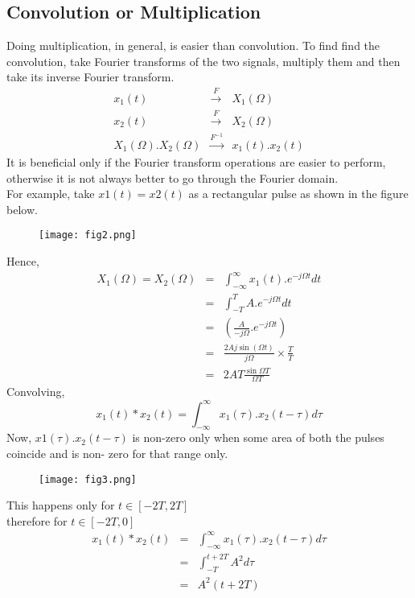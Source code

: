 \subsection{Convolution or Multiplication}
Doing multiplication, in general, is easier than convolution. To find find the convolution, take Fourier transforms of the two signals, multiply them and then take its inverse Fourier transform.
\begin{eqnarray}
x_1(t) &\xrightarrow{F}& X_1(\Omega)\\
x_2(t) &\xrightarrow{F}& X_2(\Omega)\\
X_1(\Omega).X_2(\Omega) &\xrightarrow{F^{-1}}& x_1(t).x_2(t)
\end{eqnarray}
It is beneficial only if the Fourier transform operations are easier to perform, otherwise it is not always better to go through the Fourier domain.\\
For example, take $x1(t)=x2(t)$ as a rectangular pulse as shown in the figure below.
\begin{figure}[h!]
\centering
\texttt{[image: fig2.png]}
\end{figure}
Hence,
\begin{eqnarray}
X_1(\Omega)=X_2(\Omega) &=& \int_{-\infty}^{\infty} x_1(t). e^{-j\Omega t}dt\\
&=& \int_{-T}^{T}A.e^{-j\Omega t}dt\\
&=& \left(\frac{A}{-j\Omega}.e^{-j\Omega t}\right)\\
&=& \frac{2Aj \sin(\Omega t)}{j\Omega} \times \frac{T}{T}\\
&=& 2AT \frac{\sin{\Omega T}}{\Omega T}
\end{eqnarray}
Convolving,
\begin{equation}
x_1(t)*x_2(t)=\int_{-\infty}^{\infty}x_1(\tau).x_2(t-\tau)d\tau
\end{equation}
Now, $x1(\tau). x_2(t-\tau)$ is non-zero only when some area of both the pulses coincide and is non- zero for that range only.\\
\begin{figure}[h!]
\centering
\texttt{[image: fig3.png]}
\end{figure}
This happens only for $t \in [-2T,2T]$\\
therefore for $t \in [-2T,0]$
\begin{eqnarray}
x_1(t)*x_2(t) &=& \int_{-\infty}^{\infty}x_1(\tau).x_2(t-\tau)d\tau\\
&=&\int_{-T}^{t+2T}A^2 d\tau \\
&=& A^2 (t+2T)
\end{eqnarray}
